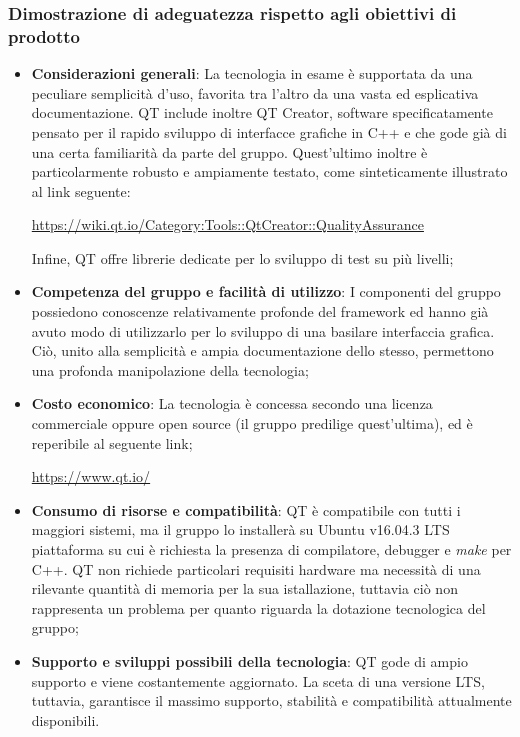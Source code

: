 \documentclass[./../Technology Baseline.tex]{subfiles}
\begin{document}
\subsubsection{Dimostrazione di adeguatezza rispetto agli obiettivi di prodotto}
\begin{itemize}
	\item \textbf{Considerazioni generali}: La tecnologia in esame è supportata da una peculiare semplicità d'uso, favorita tra l'altro da una vasta ed esplicativa documentazione. QT include inoltre QT Creator, software specificatamente pensato per il rapido sviluppo di interfacce grafiche in C++ e che gode già di una certa familiarità da parte del gruppo. Quest'ultimo inoltre è particolarmente robusto e ampiamente testato, come sinteticamente illustrato al link seguente:
	\begin{center}
		\url{https://wiki.qt.io/Category:Tools::QtCreator::QualityAssurance}
	\end{center}
	Infine, QT offre librerie dedicate per lo sviluppo di test su più livelli;
		
	\item \textbf{Competenza del gruppo e facilità di utilizzo}: I componenti del gruppo possiedono conoscenze relativamente profonde del framework ed hanno già avuto modo di utilizzarlo per lo sviluppo di una basilare interfaccia grafica. Ciò, unito alla semplicità e ampia documentazione dello stesso, permettono una profonda manipolazione della tecnologia;
	
	\item \textbf{Costo economico}: La tecnologia è concessa secondo una licenza commerciale oppure open source (il gruppo predilige quest'ultima), ed è reperibile al seguente link;
	\begin{center}
		\url{https://www.qt.io/}
	\end{center}
	
	\item \textbf{Consumo di risorse e compatibilità}: QT è compatibile con tutti i maggiori sistemi, ma il gruppo lo installerà su Ubuntu v16.04.3 LTS piattaforma su cui è richiesta la presenza di compilatore, debugger e \textit{make} per C++. QT non richiede particolari requisiti hardware ma necessità di una rilevante quantità di memoria per la sua istallazione, tuttavia ciò non rappresenta un problema per quanto riguarda la dotazione tecnologica del gruppo;
	
	\item \textbf{Supporto e sviluppi possibili della tecnologia}: QT gode di ampio supporto e viene costantemente aggiornato. La sceta di una versione LTS, tuttavia, garantisce il massimo supporto, stabilità e compatibilità attualmente disponibili.
\end{itemize}
\end{document}
